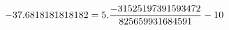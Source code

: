 \documentclass[preview]{standalone}
\begin{document}
\begin{align*}
\special{dvisvgm:raw <g id='unique000'>}-37.6818181818182 = 5.\frac{-31525197391593472}{825659931684591} - 10\special{dvisvgm:raw </g>}
\end{align*}
\end{document}

